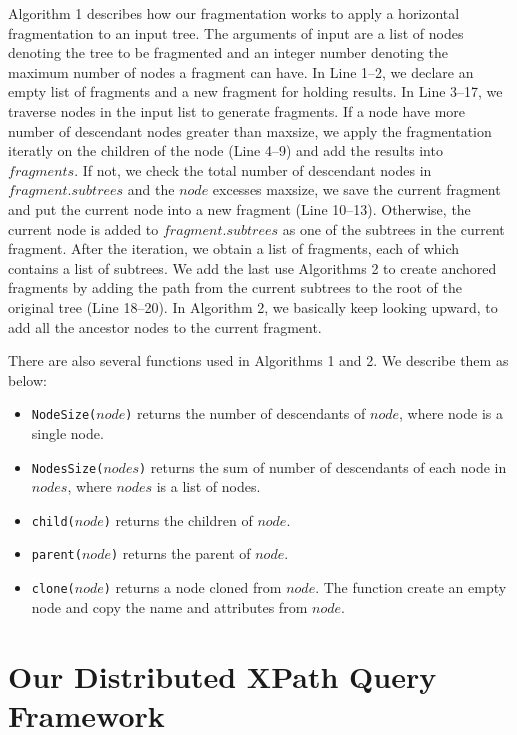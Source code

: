   
Algorithm 1 describes how our fragmentation works to apply a horizontal
fragmentation to an input tree. The arguments of input are a list of nodes
denoting the tree to be fragmented and an integer number denoting the maximum
number of nodes a fragment can have.  In Line 1--2, we declare an empty list of
fragments and a new fragment for holding results. In Line 3--17, we traverse
nodes in the input list to generate fragments. If a node have more number of
descendant nodes greater than maxsize, we apply the fragmentation iteratly on
the children of the node (Line 4--9) and add the results into $fragments$. If
not, we check the total number of descendant nodes in $fragment.subtrees$ and
the $node$ excesses maxsize, we save the current fragment and put the current
node into a new fragment (Line 10--13). Otherwise, the current node is added to
$fragment.subtrees$ as one of the subtrees in the current fragment. After the
iteration, we obtain a list of fragments, each of which contains a list of
subtrees. We add the last use Algorithms 2 to create anchored fragments by
adding the path from the current subtrees to the root of the original tree (Line
18--20). In Algorithm 2, we basically keep looking upward, to add all the
ancestor nodes to the current fragment.

There are also several functions used in Algorithms 1 and 2. We describe 
them as below:

\begin{itemize}
	\item \texttt{NodeSize($node$)} returns the number of descendants of $node$, 
	where node is a single node. 
	\item \texttt{NodesSize($nodes$)} returns the sum of number of descendants 
	of each node in $nodes$, where $nodes$ is a list of nodes. 
	\item \texttt{child($node$)} returns the children of $node$.
	\item \texttt{parent($node$)} returns the parent of $node$. 
	\item \texttt{clone($node$)} returns a node cloned from $node$. The function create
	an empty node and copy the name and attributes from $node$.
\end{itemize}

\section{Our Distributed XPath Query Framework}

